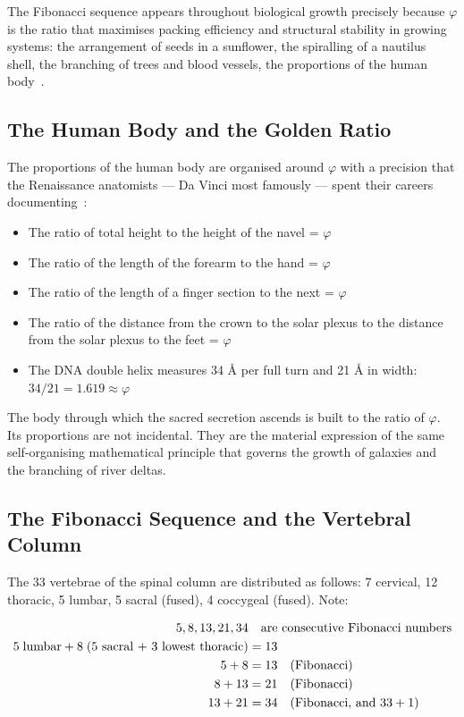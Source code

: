 \documentclass[12pt, a4paper]{article}
\begin{document}
The Fibonacci sequence appears throughout biological growth precisely because
$\varphi$ is the ratio that maximises packing efficiency and structural
stability in growing systems: the arrangement of seeds in a sunflower, the
spiralling of a nautilus shell, the branching of trees and blood vessels, the
proportions of the human body~\autocite{schneider1994}.

\subsection{The Human Body and the Golden Ratio}

The proportions of the human body are organised around $\varphi$ with a
precision that the Renaissance anatomists — Da Vinci most famously — spent
their careers documenting~\autocite{lawlor1982}:

\begin{itemize}[leftmargin=1.5cm]
  \item The ratio of total height to the height of the navel = $\varphi$
  \item The ratio of the length of the forearm to the hand = $\varphi$
  \item The ratio of the length of a finger section to the next = $\varphi$
  \item The ratio of the distance from the crown to the solar plexus to the
  distance from the solar plexus to the feet = $\varphi$
  \item The DNA double helix measures 34 \AA{} per full turn and 21 \AA{} in
  width: $34/21 = 1.619 \approx \varphi$
\end{itemize}

The body through which the sacred secretion ascends is built to the ratio of
$\varphi$. Its proportions are not incidental. They are the material expression
of the same self-organising mathematical principle that governs the growth of
galaxies and the branching of river deltas.

\subsection{The Fibonacci Sequence and the Vertebral Column}

The 33 vertebrae of the spinal column are distributed as follows: 7 cervical,
12 thoracic, 5 lumbar, 5 sacral (fused), 4 coccygeal (fused). Note:

\begin{align}
5, 8, 13, 21, 34 &\quad \text{are consecutive Fibonacci numbers} \notag \\
5 \; \text{lumbar} + 8 \; \text{(5 sacral + 3 lowest thoracic)} &= 13 \notag \\
5 + 8 &= 13 \quad (\text{Fibonacci}) \notag \\
8 + 13 &= 21 \quad (\text{Fibonacci}) \notag \\
13 + 21 &= 34 \quad (\text{Fibonacci, and } 33+1) \notag
\end{align}
\end{document}
